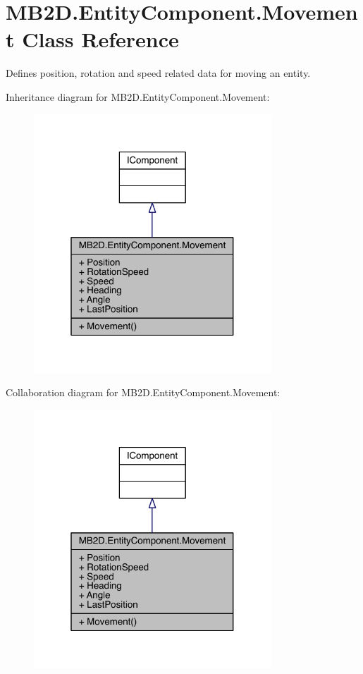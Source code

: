 \hypertarget{class_m_b2_d_1_1_entity_component_1_1_movement}{}\section{M\+B2\+D.\+Entity\+Component.\+Movement Class Reference}
\label{class_m_b2_d_1_1_entity_component_1_1_movement}


Defines position, rotation and speed related data for moving an entity.  




Inheritance diagram for M\+B2\+D.\+Entity\+Component.\+Movement\+:\nopagebreak
\begin{figure}[H]
\begin{center}
\leavevmode
\includegraphics[width=253pt]{class_m_b2_d_1_1_entity_component_1_1_movement__inherit__graph}
\end{center}
\end{figure}


Collaboration diagram for M\+B2\+D.\+Entity\+Component.\+Movement\+:\nopagebreak
\begin{figure}[H]
\begin{center}
\leavevmode
\includegraphics[width=253pt]{class_m_b2_d_1_1_entity_component_1_1_movement__coll__graph}
\end{center}
\end{figure}
